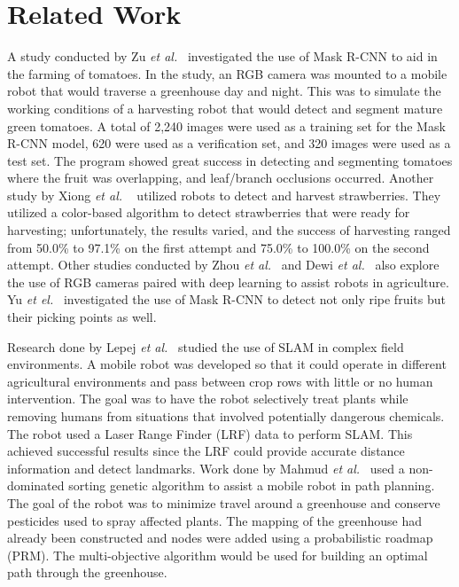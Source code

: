 \documentclass[12pt]{article}
\begin{document}
\section{Related Work}
A study conducted by Zu \emph{et al.}~\cite{zu2021detection} investigated the use of Mask R-CNN to aid in the farming of tomatoes. In the study, an RGB camera was mounted to a mobile robot that would traverse a greenhouse day and night. This was to simulate the working conditions of a harvesting robot that would detect and segment mature green tomatoes. A total of 2,240 images were used as a training set for the Mask R-CNN model, 620 were used as a verification set, and 320 images were used as a test set. The program showed great success in detecting and segmenting tomatoes where the fruit was overlapping, and leaf/branch occlusions occurred. Another study by Xiong \emph{et al. }~\cite{xiong2020autonomous} utilized robots to detect and harvest strawberries. They utilized a color-based algorithm to detect strawberries that were ready for harvesting; unfortunately, the results varied, and the success of harvesting ranged from 50.0\% to 97.1\% on the first attempt and 75.0\% to 100.0\% on the second attempt. Other studies conducted by Zhou \emph{et al.}~\cite{zhou2022intelligent} and Dewi \emph{et al.}~\cite{dewi2021blob} also explore the use of RGB cameras paired with deep learning to assist robots in agriculture. Yu \emph{et el.}~\cite{yu2019fruit} investigated the use of Mask R-CNN to detect not only ripe fruits but their picking points as well.

Research done by Lepej \emph{et al.}~\cite{LEPEJ2016160} studied the use of SLAM in complex field environments. A mobile robot was developed so that it could operate in different agricultural environments and pass between crop rows with little or no human intervention. The goal was to have the robot selectively treat plants while removing humans from situations that involved potentially dangerous chemicals. The robot used a Laser Range Finder (LRF) data to perform SLAM. This achieved successful results since the LRF could provide accurate distance information and detect landmarks. Work done by Mahmud \emph{et al.}~\cite{MAHMUD2019488} used a non-dominated sorting genetic algorithm to assist a mobile robot in path planning. The goal of the robot was to minimize travel around a greenhouse and conserve pesticides used to spray affected plants. The mapping of the greenhouse had already been constructed and nodes were added using a probabilistic roadmap (PRM). The multi-objective algorithm would be used for building an optimal path through the greenhouse.
\end{document}
